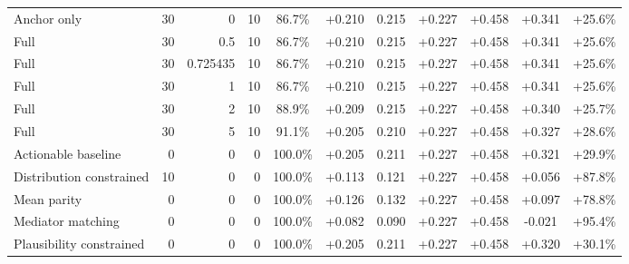 \begin{table}[htbp]
\begin{tabular}{lrrrccccccc}
Anchor only & 30 & 0 & 10 & 86.7\% & +0.210 & 0.215 & +0.227 & +0.458 & +0.341 & +25.6\% \\
Full & 30 & 0.5 & 10 & 86.7\% & +0.210 & 0.215 & +0.227 & +0.458 & +0.341 & +25.6\% \\
Full & 30 & 0.725435 & 10 & 86.7\% & +0.210 & 0.215 & +0.227 & +0.458 & +0.341 & +25.6\% \\
Full & 30 & 1 & 10 & 86.7\% & +0.210 & 0.215 & +0.227 & +0.458 & +0.341 & +25.6\% \\
Full & 30 & 2 & 10 & 88.9\% & +0.209 & 0.215 & +0.227 & +0.458 & +0.340 & +25.7\% \\
Full & 30 & 5 & 10 & 91.1\% & +0.205 & 0.210 & +0.227 & +0.458 & +0.327 & +28.6\% \\
Actionable baseline & 0 & 0 & 0 & 100.0\% & +0.205 & 0.211 & +0.227 & +0.458 & +0.321 & +29.9\% \\
Distribution constrained & 10 & 0 & 0 & 100.0\% & +0.113 & 0.121 & +0.227 & +0.458 & +0.056 & +87.8\% \\
Mean parity & 0 & 0 & 0 & 100.0\% & +0.126 & 0.132 & +0.227 & +0.458 & +0.097 & +78.8\% \\
Mediator matching & 0 & 0 & 0 & 100.0\% & +0.082 & 0.090 & +0.227 & +0.458 & -0.021 & +95.4\% \\
Plausibility constrained & 0 & 0 & 0 & 100.0\% & +0.205 & 0.211 & +0.227 & +0.458 & +0.320 & +30.1\% \\
\bottomrule
\end{tabular}
\end{table}